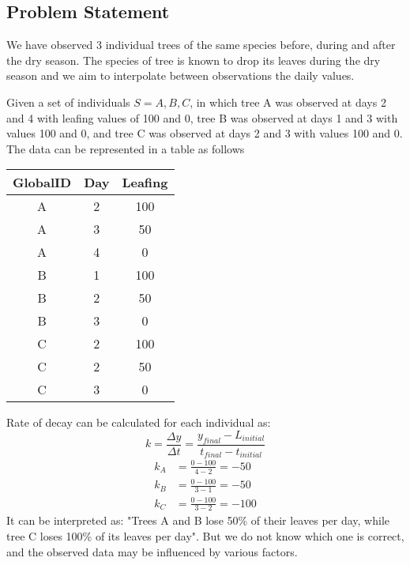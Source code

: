 \documentclass{article}
\begin{document}
\subsection{Problem Statement}

We have observed 3 individual trees of the same species before, during and after the dry season.
The species of tree is known to drop its leaves during the dry season and we aim to interpolate between observations the daily values.

Given a set of individuals $S={A,B,C}$, in which tree A was observed at days 2 and 4 with leafing values of 100 and 0, tree B was observed at days 1 and 3 with values 100 and 0, and tree C was observed at days 2 and 3 with values 100 and 0.
The data can be represented in a table as follows

\begin{table}[h]
    \centering
    \begin{tabular}{|c|c|c|}
        \hline
        GlobalID & Day & Leafing \\
        \hline
        A & 2 & 100 \\
        A & 3 & 50 \\
        A & 4 & 0 \\
        B & 1 & 100 \\
        B & 2 & 50 \\
        B & 3 & 0 \\
        C & 2 & 100 \\
        C & 2 & 50 \\
        C & 3 & 0 \\
        \hline
    \end{tabular}
\end{table}

Rate of decay can be calculated for each individual as:
\begin{equation}
    k= \frac{\Delta y}{\Delta t} = \frac{y_{final} - L_{initial}}{t_{final} - t_{initial}}
\end{equation}
\begin{align}
    k_A &= \frac{0 - 100}{4 - 2} = -50 \\
    k_B &= \frac{0 - 100}{3 - 1} = -50 \\
    k_C &= \frac{0 - 100}{3 - 2} = -100
\end{align}
It can be interpreted as: "Trees A and B lose 50\% of their leaves per day, while tree C loses 100\% of its leaves per day".
But we do not know which one is correct, and the observed data may be influenced by various factors.
\end{document}
